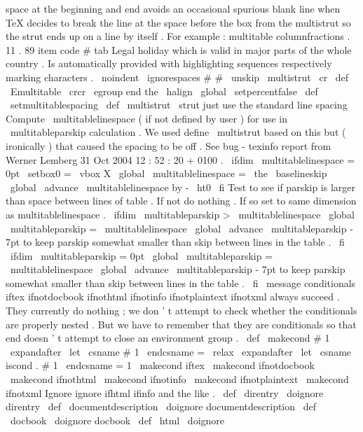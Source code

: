 {{{{{{space
at
the
beginning
and
end
avoids
an
occasional
spurious
%
blank
line
when
TeX
decides
to
break
the
line
at
the
space
before
the
%
box
from
the
multistrut
so
the
strut
ends
up
on
a
line
by
itself
.
%
For
example
:
%
multitable
columnfractions
.
11
.
89
%
item
code
{
#
}
%
tab
Legal
holiday
which
is
valid
in
major
parts
of
the
whole
country
.
%
Is
automatically
provided
with
highlighting
sequences
respectively
%
marking
characters
.
\
noindent
\
ignorespaces
#
#
\
unskip
\
multistrut
}
\
cr
}
\
def
\
Emultitable
{
%
\
crcr
\
egroup
%
end
the
\
halign
\
global
\
setpercentfalse
}
\
def
\
setmultitablespacing
{
%
\
def
\
multistrut
{
\
strut
}
%
just
use
the
standard
line
spacing
%
%
Compute
\
multitablelinespace
(
if
not
defined
by
user
)
for
use
in
%
\
multitableparskip
calculation
.
We
used
define
\
multistrut
based
on
%
this
but
(
ironically
)
that
caused
the
spacing
to
be
off
.
%
See
bug
-
texinfo
report
from
Werner
Lemberg
31
Oct
2004
12
:
52
:
20
+
0100
.
\
ifdim
\
multitablelinespace
=
0pt
\
setbox0
=
\
vbox
{
X
}
\
global
\
multitablelinespace
=
\
the
\
baselineskip
\
global
\
advance
\
multitablelinespace
by
-
\
ht0
\
fi
%
Test
to
see
if
parskip
is
larger
than
space
between
lines
of
%
table
.
If
not
do
nothing
.
%
If
so
set
to
same
dimension
as
multitablelinespace
.
\
ifdim
\
multitableparskip
>
\
multitablelinespace
\
global
\
multitableparskip
=
\
multitablelinespace
\
global
\
advance
\
multitableparskip
-
7pt
%
to
keep
parskip
somewhat
smaller
%
than
skip
between
lines
in
the
table
.
\
fi
%
\
ifdim
\
multitableparskip
=
0pt
\
global
\
multitableparskip
=
\
multitablelinespace
\
global
\
advance
\
multitableparskip
-
7pt
%
to
keep
parskip
somewhat
smaller
%
than
skip
between
lines
in
the
table
.
\
fi
}
\
message
{
conditionals
}
%
iftex
ifnotdocbook
ifnothtml
ifnotinfo
ifnotplaintext
%
ifnotxml
always
succeed
.
They
currently
do
nothing
;
we
don
'
t
%
attempt
to
check
whether
the
conditionals
are
properly
nested
.
But
we
%
have
to
remember
that
they
are
conditionals
so
that
end
doesn
'
t
%
attempt
to
close
an
environment
group
.
%
\
def
\
makecond
#
1
{
%
\
expandafter
\
let
\
csname
#
1
\
endcsname
=
\
relax
\
expandafter
\
let
\
csname
iscond
.
#
1
\
endcsname
=
1
}
\
makecond
{
iftex
}
\
makecond
{
ifnotdocbook
}
\
makecond
{
ifnothtml
}
\
makecond
{
ifnotinfo
}
\
makecond
{
ifnotplaintext
}
\
makecond
{
ifnotxml
}
%
Ignore
ignore
ifhtml
ifinfo
and
the
like
.
%
\
def
\
direntry
{
\
doignore
{
direntry
}
}
\
def
\
documentdescription
{
\
doignore
{
documentdescription
}
}
\
def
\
docbook
{
\
doignore
{
docbook
}
}
\
def
\
html
{
\
doignore
}}}}}
